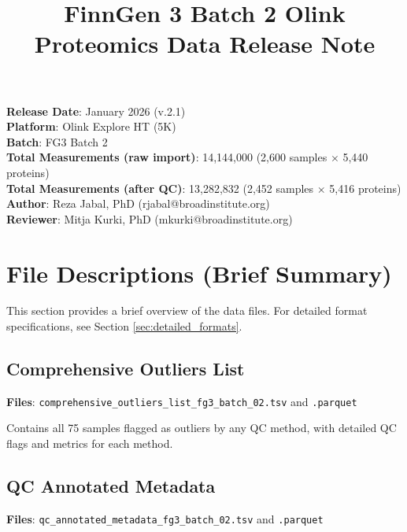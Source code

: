 \documentclass[11pt,a4paper]{article}
\title{FinnGen 3 Batch 2 Olink Proteomics Data Release Note}
\date{}
\begin{document}
\maketitle
\thispagestyle{empty}

\vspace{6cm}

\textbf{Release Date}: January 2026 (v.2.1) \\

\textbf{Platform}: Olink Explore HT (5K) \\

\textbf{Batch}: FG3 Batch 2 \\

\textbf{Total Measurements (raw import)}: 14,144,000 (2,600 samples $\times$ 5,440 proteins) \\

\textbf{Total Measurements (after QC)}: 13,282,832 (2,452 samples $\times$ 5,416 proteins) \\

\textbf{Author}: Reza Jabal, PhD (rjabal@broadinstitute.org) \\

\textbf{Reviewer}: Mitja Kurki, PhD (mkurki@broadinstitute.org)

\newpage
\tableofcontents
\newpage

\section{File Descriptions (Brief Summary)}

This section provides a brief overview of the data files. For detailed format specifications, see Section \ref{sec:detailed_formats}.

\subsection{Comprehensive Outliers List}

\textbf{Files}: \texttt{comprehensive\_outliers\_list\_fg3\_batch\_02.tsv} and \texttt{.parquet}

Contains all 75 samples flagged as outliers by any QC method, with detailed QC flags and metrics for each method.

\subsection{QC Annotated Metadata}

\textbf{Files}: \texttt{qc\_annotated\_metadata\_fg3\_batch\_02.tsv} and \texttt{.parquet}
\end{document}
